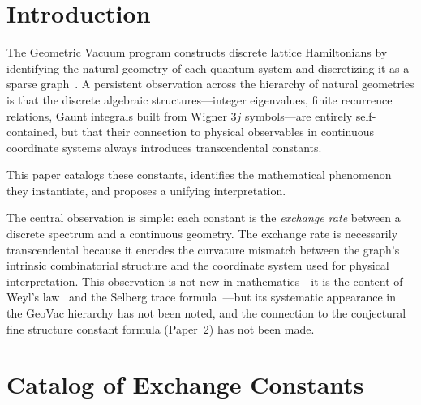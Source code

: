 \documentclass[aps,pra,twocolumn,superscriptaddress,longbibliography]{revtex4-2}
\begin{document}
\maketitle


\section{Introduction}
\label{sec:intro}

The Geometric Vacuum program constructs discrete lattice
Hamiltonians by identifying the natural geometry of each quantum
system and discretizing it as a sparse
graph~\cite{loutey_paper0,loutey_paper1,loutey_paper7}.  A
persistent observation across the hierarchy of natural geometries
is that the discrete algebraic structures---integer eigenvalues,
finite recurrence relations, Gaunt integrals built from Wigner
$3j$ symbols---are entirely self-contained, but that their
connection to physical observables in continuous coordinate
systems always introduces transcendental constants.

This paper catalogs these constants, identifies the mathematical
phenomenon they instantiate, and proposes a unifying
interpretation.

The central observation is simple: each constant is the
\textit{exchange rate} between a discrete spectrum and a
continuous geometry.  The exchange rate is necessarily
transcendental because it encodes the curvature mismatch between
the graph's intrinsic combinatorial structure and the coordinate
system used for physical interpretation.  This observation is
not new in mathematics---it is the content of Weyl's
law~\cite{weyl1911} and the Selberg trace
formula~\cite{selberg1956}---but its systematic appearance in
the GeoVac hierarchy has not been noted, and the connection
to the conjectural fine structure constant formula (Paper~2)
has not been made.



\section{Catalog of Exchange Constants}
\label{sec:catalog}
\end{document}
